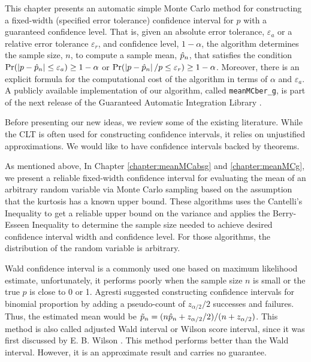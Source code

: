 \documentclass{iitthesis}
\theoremstyle{definition}
\begin{document}
This chapter presents an automatic simple Monte Carlo method for constructing a fixed-width (specified error tolerance) confidence interval for $p$ with a guaranteed confidence level. That is, given an absolute error tolerance, $\varepsilon_a$ or a relative error tolerance $\varepsilon_r$, and confidence level, $1-\alpha$, the algorithm determines the sample size, $n$, to compute a sample mean, $\hat{p}_n$, that satisfies the condition $\Pr(\left \lvert p-\hat{p}_n \right \rvert\leq \varepsilon_a) \geq 1-\alpha$ or $\Pr(\left \lvert p-\hat{p}_n \right \rvert/p\leq \varepsilon_r) \geq 1-\alpha$.  Moreover, there is an explicit formula for the computational cost of the algorithm in terms of $\alpha$ and $\varepsilon_a$. A publicly available implementation of our algorithm, called {\tt meanMCber\_g}, is part of the next release of the Guaranteed Automatic Integration Library \cite{GAIL_2_1}.


Before presenting our new ideas, we review some of the existing literature.  While the CLT is often used for constructing confidence intervals, it relies on unjustified approximations.  We would like to have confidence intervals backed by theorems.

As mentioned above, In Chapter \ref{chapter:meanMCabsg} and \ref{chapter:meanMCg}, we present a reliable fixed-width confidence interval for evaluating the mean of an arbitrary random variable via Monte Carlo sampling based on the assumption that the kurtosis has a known upper bound. These algorithms uses the Cantelli's Inequality to get a reliable upper bound on the variance and applies the Berry-Esseen Inequality to determine the sample size needed to achieve desired confidence interval width and confidence level. For those algorithms, the distribution of the random variable is arbitrary. 

Wald confidence interval \cite[Section 1.3.3]{Agresti02} is a commonly used one based on maximum likelihood estimate, unfortunately, it performs poorly when the sample size $n$ is small or the true $p$ is close to 0 or 1. Agresti \cite[Section 1.4.2]{Agresti02} suggested constructing confidence intervals for binomial proportion by adding a pseudo-count of $z_{\alpha/2}/2$ successes and failures. Thus, the estimated mean would be $\tilde{p}_n =(n\hat{p}_n+z_{\alpha/2}/2) / (n+z_{\alpha/2})$. This method is also called adjusted Wald interval or Wilson score interval, since it was first discussed by E. B. Wilson \cite{wilson27}. This method performs better than the Wald interval. However, it is an approximate result and carries no guarantee.
\end{document}
